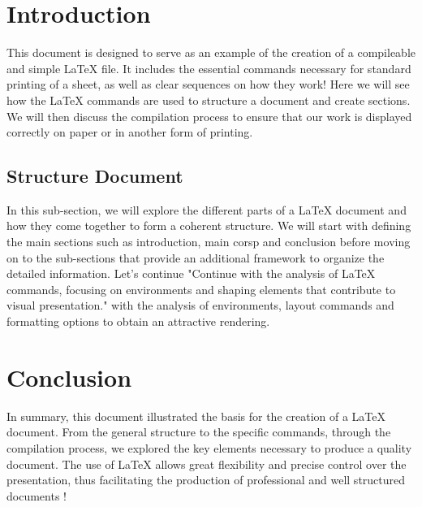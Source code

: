 \documentclass{article}
\begin{document}


\section{Introduction}
This document is designed to serve as an example of the creation of a compileable and simple LaTeX file. It includes the essential commands necessary for standard printing of a sheet, as well as clear sequences on how they work! Here we will see how the LaTeX commands are used to structure a document and create sections. We will then discuss the compilation process to ensure that our work is displayed correctly on paper or in another form of printing.

\subsection{Structure Document} 

In this sub-section, we will explore the different parts of a LaTeX document and how they come together to form a coherent structure. We will start with defining the main sections such as introduction, main corsp and conclusion before moving on to the sub-sections that provide an additional framework to organize the detailed information. Let's continue "Continue with the analysis of LaTeX commands, focusing on environments and shaping elements that contribute to visual presentation." with the analysis of environments, layout commands and formatting options to obtain an attractive rendering.

\section{Conclusion}
In summary, this document illustrated the basis for the creation of a LaTeX document. From the general structure to the specific commands, through the compilation process, we explored the key elements necessary to produce a quality document. The use of LaTeX allows great flexibility and precise control over the presentation, thus facilitating the production of professional and well structured documents !
\end{document}
